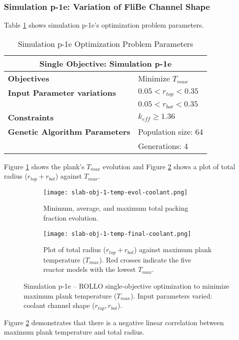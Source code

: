 \subsubsection{Simulation p-1e: Variation of FliBe Channel Shape}
Table \ref{tab:simulationp1e} shows simulation p-1e's optimization problem parameters. 
\begin{table}[htbp]
    \centering
    \onehalfspacing
    \caption{Simulation p-1e Optimization Problem Parameters}
	\label{tab:simulationp1e}
    \footnotesize
    \begin{tabular}{l|p{3cm}}
    \hline 
    \multicolumn{2}{c}{\textbf{Single Objective: Simulation p-1e}} \\
    \hline 
    \textbf{Objectives} & Minimize $T_{max}$ \\
    \hline 
    \textbf{Input Parameter variations} & $0.05<r_{top}<0.35$ \\
    & $0.05<r_{bot}<0.35$ \\
    \hline
    \textbf{Constraints} & $k_{eff} \geq 1.36$\\ 
    \hline 
    \textbf{Genetic Algorithm Parameters} & Population size: 64 \\
    & Generations: 4 \\
    \hline
    \end{tabular}
\end{table}
Figure \ref{fig:slab-obj-1-temp-evol-coolant} shows the plank's $T_{max}$ evolution 
and Figure \ref{fig:slab-obj-1-temp-final-coolant} shows a plot of total radius 
($r_{top} + r_{bot}$) against $T_{max}$. 
\begin{figure}[htbp]
    \centering
    \begin{subfigure}{\textwidth}
        \texttt{[image: slab-obj-1-temp-evol-coolant.png]}
        \caption{Minimum, average, and maximum total packing fraction evolution.}
        \label{fig:slab-obj-1-temp-evol-coolant} 
    \end{subfigure}
    \begin{subfigure}{\textwidth}
        \texttt{[image: slab-obj-1-temp-final-coolant.png]}
        \caption{Plot of total radius ($r_{top} + r_{bot}$) against maximum plank 
        temperature ($T_{max}$). Red crosses indicate the five reactor models with the 
        lowest $T_{max}$.}
        \label{fig:slab-obj-1-temp-final-coolant} 
    \end{subfigure}
    \caption{Simulation p-1e -- ROLLO single-objective optimization to minimize 
    maximum plank temperature ($T_{max}$). Input parameters varied: coolant channel shape 
    ($r_{top}, r_{bot}$).}
    \label{fig:slab-obj-1-temp-coolant}
\end{figure}
Figure \ref{fig:slab-obj-1-temp-final-coolant} demonstrates that there is a negative 
linear correlation between maximum plank temperature and total radius. 

